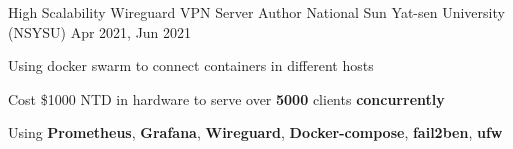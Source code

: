 \begin{multicols}{2}
\cventry
{High Scalability Wireguard VPN Server}
{Author}
{National Sun Yat-sen University (NSYSU)} %
{Apr 2021, Jun 2021} %
{
    \vspace{5pt}
    \begin{cvitem} %
        \item {Using docker swarm to connect containers in different hosts}
        \item {Cost \$1000 NTD in hardware to serve over \textbf{5000} clients \textbf{concurrently}}
        \item {Using \textbf{Prometheus}, \textbf{Grafana}, \textbf{Wireguard}, \textbf{Docker-compose}, \textbf{fail2ben}, \textbf{ufw}}
    \end{cvitem}
}

\def\customTextWidth{\textwidth}
\end{multicols}